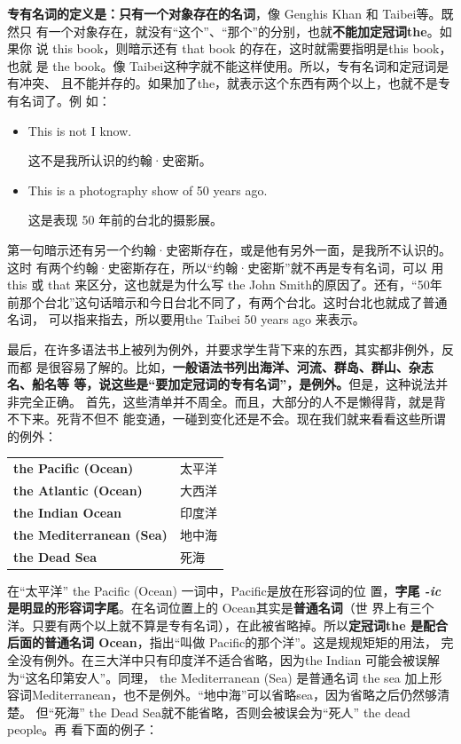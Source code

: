 \textbf{专有名词的定义是：只有一个对象存在的名词}，像 Genghis Khan 和 Taibei等。既然只
有一个对象存在，就没有“这个”、“那个”的分别，也就\textbf{不能加定冠词the}。如果你
说 this book，则暗示还有 that book 的存在，这时就需要指明是this book，也就
是 the book。像 Taibei这种字就不能这样使用。所以，专有名词和定冠词是有冲突、
且不能并存的。如果加了the，就表示这个东西有两个以上，也就不是专有名词了。例
如：

\begin{itemize}
\item  This is not  I know.

这不是我所认识的约翰·史密斯。
\item  This is a photography show of  50 years ago.

这是表现 50 年前的台北的摄影展。
\end{itemize}

第一句暗示还有另一个约翰·史密斯存在，或是他有另外一面，是我所不认识的。这时
有两个约翰·史密斯存在，所以“约翰·史密斯”就不再是专有名词，可以
用this 或 that 来区分，这也就是为什么写 the John Smith的原因了。还有，“50年
前那个台北”这句话暗示和今日台北不同了，有两个台北。这时台北也就成了普通名词，
可以指来指去，所以要用the Taibei 50 years ago 来表示。

最后，在许多语法书上被列为例外，并要求学生背下来的东西，其实都非例外，反而都
是很容易了解的。比如，\textbf{一般语法书列出海洋、河流、群岛、群山、杂志名、船名等
  等，说这些是“要加定冠词的专有名词”，是例外。}但是，这种说法并非完全正确。
首先，这些清单并不周全。而且，大部分的人不是懒得背，就是背不下来。死背不但不
能变通，一碰到变化还是不会。现在我们就来看看这些所谓的例外：

\begin{longtable}[]{@{}ll@{}}
  \textbf{the Pacific (Ocean)} & 太平洋 \\
  \textbf{the Atlantic (Ocean)} & 大西洋 \\
  \textbf{the Indian Ocean} & 印度洋 \\
  \textbf{the Mediterranean (Sea)} & 地中海 \\
  \textbf{the Dead Sea} & 死海 \\
\end{longtable}

在“太平洋” the Pacific (Ocean) 一词中，Pacific是放在形容词的位
置，\textbf{字尾 \emph{-ic} 是明显的形容词字尾}。在名词位置上的 Ocean其实是\textbf{普通名词}（世
界上有三个洋。只要有两个以上就不算是专有名词），在此被省略掉。所以\textbf{定冠词the
  是配合后面的普通名词 Ocean}，指出“叫做 Pacific的那个洋”。这是规规矩矩的用法，
完全没有例外。在三大洋中只有印度洋不适合省略，因为the Indian 可能会被误解
为“这名印第安人”。同理， the Mediterranean (Sea) 是普通名词 the sea 加上形
容词Mediterranean，也不是例外。“地中海”可以省略sea，因为省略之后仍然够清楚。
但“死海” the Dead Sea就不能省略，否则会被误会为“死人” the dead people。再
看下面的例子：

